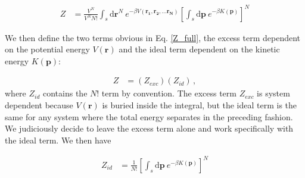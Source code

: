 \documentclass[12pt]{article}
\newcommand*{\diff}{\mathrm{d}}
\begin{document}
\begin{align}
    Z &= \frac{V^N}{V^N N!}\int_s \diff\mathbf{r}^N ~e^{-\beta V(\mathbf{r_1}, \mathbf{r_2}, \dots \mathbf{r_N})} \left[\int_s \diff\mathbf{p}~e^{-\beta K(\mathbf{p})}\right]^{N}
    \label{Z_full}
\end{align}

We then define the two terms obvious in Eq. \ref{Z_full}, the excess term dependent on the potential energy $V(\mathbf{r})$ and the ideal term dependent on the kinetic energy $K(\mathbf{p})$: 

\begin{align}
    Z &= (Z_{exc})(Z_{id}) \,,
\end{align}
where $Z_{id}$ contains the $N!$ term by convention. The excess term $Z_{exc}$ is system dependent because $V(\mathbf{r})$ is buried inside the integral, but the ideal term is the same for any system where the total energy separates in the preceding fashion. We judiciously decide to leave the excess term alone and work specifically with the ideal term. We then have

\begin{align}
    Z_{id} &=  \frac{1}{N!}\left[\int_s \diff\mathbf{p} ~e^{-\beta K(\mathbf{p})}\right]^{N}
\end{align}
\end{document}
